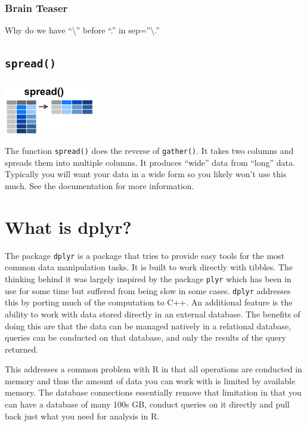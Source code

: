 \documentclass[
]{book}
\begin{document}
\hypertarget{brain-teaser-1}{%
\subsubsection*{Brain Teaser}\label{brain-teaser-1}}

Why do we have ``\textbackslash{}'' before ``.'' in sep=''\textbackslash.''

\hypertarget{spread}{%
\subsection*{\texorpdfstring{\texttt{spread()}}{spread()}}\label{spread}}

\includegraphics{./figures/tidyr-spread.png}

The function \texttt{spread()} does the reverse of \texttt{gather()}. It takes two columns and spreads them into multiple columns. It produces ``wide'' data from ``long'' data. Typically you will want your data in a wide form so you likely won't use this much. See the documentation for more information.

\hypertarget{what-is-dplyr}{%
\section{What is dplyr?}\label{what-is-dplyr}}

The package \texttt{dplyr} is a package that tries to provide easy tools for the most common data manipulation tasks. It is built to work directly with tibbles. The thinking behind it was largely inspired by the package \texttt{plyr} which has been in use for some time but suffered from being slow in some cases. \texttt{dplyr} addresses this by porting much of the computation to C++. An additional feature is the ability to work with data stored directly in an external database. The benefits of doing this are that the data can be managed natively in a relational database, queries can be conducted on that database, and only the results of the query returned.

This addresses a common problem with R in that all operations are conducted in memory and thus the amount of data you can work with is limited by available memory. The database connections essentially remove that limitation in that you can have a database of many 100s GB, conduct queries on it directly and pull back just what you need for analysis in R.
\end{document}
